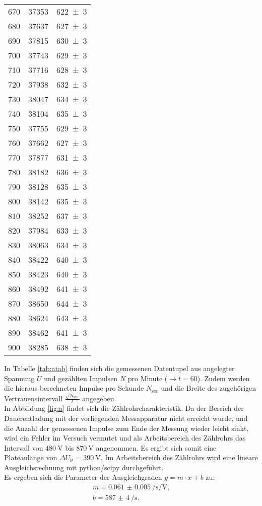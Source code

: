\begin{longtable}{ccc}
670  & 37353  & \num{622(3)}\\
680  & 37637  & \num{627(3)}\\
690  & 37815  & \num{630(3)}\\
700  & 37743  & \num{629(3)}\\
710  & 37716  & \num{628(3)}\\
720  & 37938  & \num{632(3)}\\
730  & 38047  & \num{634(3)}\\
740  & 38104  & \num{635(3)}\\
750  & 37755  & \num{629(3)}\\
760  & 37662  & \num{627(3)}\\
770  & 37877  & \num{631(3)}\\
780  & 38182  & \num{636(3)}\\
790  & 38128  & \num{635(3)}\\
800  & 38142  & \num{635(3)}\\
810  & 38252  & \num{637(3)}\\
820  & 37984  & \num{633(3)}\\
830  & 38063  & \num{634(3)}\\
840  & 38422  & \num{640(3)}\\
850  & 38423  & \num{640(3)}\\
860  & 38492  & \num{641(3)}\\
870  & 38650  & \num{644(3)}\\
880  & 38624  & \num{643(3)}\\
890  & 38462  & \num{641(3)}\\
900  & 38285  & \num{638(3)}\\
\bottomrule
\end{longtable}


In Tabelle \ref{tab:atab} finden sich die gemessenen Datentupel aus angelegter Spannung $U$ und gezählten Impulsen $N$ pro Minute ($\rightarrow t=60$). Zudem werden die hieraus berechneten Impulse pro Sekunde $N_\mathrm{sec}$ und die Breite des zugehörigen Vertrauensintervall $\frac{\sqrt{N_\mathrm{sec}}}{t}$ angegeben.\\
In Abbildung \ref{fig:a} findet sich die Zählrohrcharakteristik.
Da der Bereich der Dauerentladung mit der vorliegenden Messapparatur nicht erreicht wurde, und die Anzahl der gemessenen Impulse zum Ende der Messung wieder leicht sinkt, wird ein Fehler im Versuch vermutet und als Arbeitsbereich des Zählrohrs das Intervall von $\SI{480}{\volt}$ bis $\SI{870}{\volt}$ angenommen.
Es ergibt sich somit eine Plateaulänge von $\Delta U_\mathrm{P}=\SI{390}{\volt}$.
Im Arbeitsbereich des Zählrohrs wird eine lineare Ausgleichsrechnung mit python/scipy \cite{scipy} durchgeführt.\\
Es ergeben sich die Parameter der Ausgleichgraden $y=m\cdot x+b$ zu:
\begin{align}
  m=  \SI{0.061(5)}{\per\second\per\volt} \text{,}\\
  b=  \SI{587(4)}{\per\second}\text{.}
\end{align}

